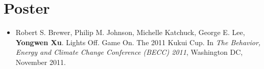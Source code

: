 \section{Poster}

\begin{itemize}

\item  Robert S. Brewer, Philip M. Johnson, Michelle Katchuck, George E. Lee, \textbf{Yongwen Xu}. Lights Off. Game On. The 2011 Kukui Cup. In \emph{The Behavior, Energy and Climate Change Conference (BECC) 2011}, Washington DC, November 2011.

\end{itemize}

